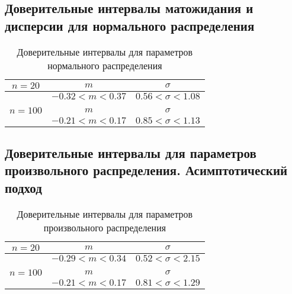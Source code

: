 \subsection{Доверительные интервалы матожидания и дисперсии для нормального распределения}

\begin{table}[H]
	\begin{center}
		\begin{tabular}{|c|c|c|}
			\hline
			$n = 20$ & $m$ & $\sigma$ \\
			\hline
			& $-0.32 < m <  0.37$ & $0.56 < \sigma < 1.08$ \\
			\hline
			&&\\
			\hline
			$n = 100$ & $m$ & $\sigma$ \\
			\hline	
			& $-0.21 < m <  0.17$ & $0.85 < \sigma < 1.13$ \\
			\hline
		\end{tabular}
		\caption{Доверительные интервалы для параметров нормального распределения}
	\end{center}
\end{table}

\subsection{Доверительные интервалы для параметров произвольного распределения. Асимптотический подход}
\begin{table}[H]
	\begin{center}
		\begin{tabular}{|c|c|c|}
			\hline
			$n = 20$ & $m$ & $\sigma$ \\
			\hline
			& $-0.29 < m <  0.34$ & $0.52 < \sigma < 2.15$ \\
			\hline
			&&\\
			\hline
			$n = 100$ & $m$ & $\sigma$ \\
			\hline	
			& $-0.21 < m <  0.17$ & $0.81 < \sigma < 1.29$ \\
			\hline
		\end{tabular}
		\caption{Доверительные интервалы для параметров произвольного распределения}
	\end{center}
\end{table}